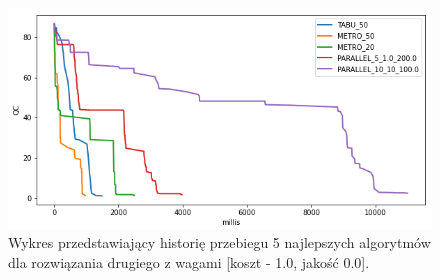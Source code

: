 \begin{figure}[ht]{}
	\centering
	\includegraphics[scale=0.85]{images/solution_2_cqp_1.png}
	\caption {
		 Wykres przedstawiający historię przebiegu 5 najlepszych algorytmów dla rozwiązania drugiego z wagami [koszt - 1.0, jakość 0.0]. 
	}
	\label{fig:sol-2-w-1}
\end{figure}

